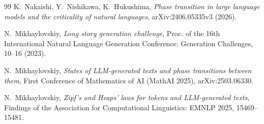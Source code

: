 \documentclass[12pt,a4paper,oneside]{report}
\begin{document}
\begin{thebibliography}{99}
K.~Nakaishi, Y.~Nishikawa, K.~Hukushima,
\emph{Phase transition in large language models and the criticality of natural
languages},
arXiv:2406.05335v3 (2026).

N.~Mikhaylovskiy,
\emph{Long story generation challenge},
Proc. of the 16th International Natural Language Generation Conference:
Generation Challenges, 10--16 (2023).

N.~Mikhaylovskiy,
\emph{States of LLM-generated texts and phase transitions between them},
First Conference of Mathematics of AI (MathAI 2025), arXiv:2503.06330.

N.~Mikhaylovskiy,
\emph{Zipf's and Heaps' laws for tokens and LLM-generated texts},
Findings of the Association for Computational Linguistics: EMNLP 2025,
15469--15481.

\end{thebibliography}


\end{document}
